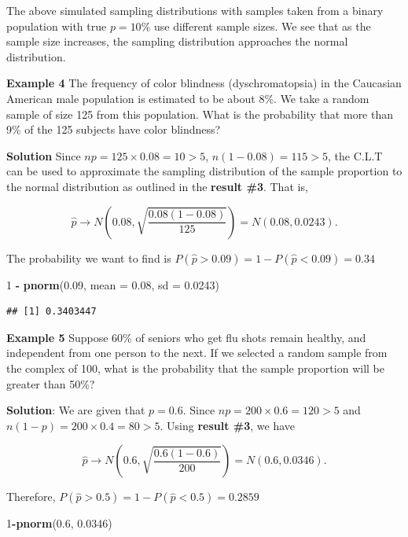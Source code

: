 \documentclass[
]{book}
\newenvironment{Shaded}{\begin{snugshade}}{\end{snugshade}}
\newcommand{\AttributeTok}[1]{\textcolor[rgb]{0.13,0.29,0.53}{#1}}
\newcommand{\DecValTok}[1]{\textcolor[rgb]{0.00,0.00,0.81}{#1}}
\newcommand{\FloatTok}[1]{\textcolor[rgb]{0.00,0.00,0.81}{#1}}
\newcommand{\FunctionTok}[1]{\textcolor[rgb]{0.13,0.29,0.53}{\textbf{#1}}}
\newcommand{\NormalTok}[1]{#1}
\newcommand{\SpecialCharTok}[1]{\textcolor[rgb]{0.81,0.36,0.00}{\textbf{#1}}}
\begin{document}
The above simulated sampling distributions with samples taken from a binary population with true \(p = 10\%\) use different sample sizes. We see that as the sample size increases, the sampling distribution approaches the normal distribution.

\textbf{Example 4} The frequency of color blindness (dyschromatopsia) in the Caucasian American male population is estimated to be about 8\%. We take a random sample of size 125 from this population. What is the probability that more than 9\% of the 125 subjects have color blindness?

\textbf{Solution} Since \(np = 125\times 0.08 = 10 > 5\), \(n(1-0.08) = 115> 5\), the C.L.T can be used to approximate the sampling distribution of the sample proportion to the normal distribution as outlined in the \textbf{result \#3}. That is,

\[
\hat{p} \to N\left(0.08, \sqrt{\frac{0.08(1-0.08)}{125}} \right) =N\left(0.08, 0.0243 \right).
\]

The probability we want to find is \(P(\hat{p} > 0.09) = 1 -P(\hat{p} < 0.09) = 0.34\)

\begin{Shaded}
\begin{Highlighting}[]
\DecValTok{1} \SpecialCharTok{{-}} \FunctionTok{pnorm}\NormalTok{(}\FloatTok{0.09}\NormalTok{, }\AttributeTok{mean =} \FloatTok{0.08}\NormalTok{, }\AttributeTok{sd =} \FloatTok{0.0243}\NormalTok{)}
\end{Highlighting}
\end{Shaded}

\begin{verbatim}
## [1] 0.3403447
\end{verbatim}

\textbf{Example 5} Suppose 60\% of seniors who get flu shots remain healthy, and independent from one person to the next. If we selected a random sample from the complex of 100, what is the probability that the sample proportion will be greater than 50\%?

\textbf{Solution}: We are given that \(p=0.6\). Since \(np=200\times 0.6 = 120 > 5\) and \(n(1-p) = 200 \times 0.4 = 80 > 5\). Using \textbf{result \#3}, we have

\[
\hat{p} \to N\left(0.6, \sqrt{\frac{0.6(1-0.6)}{200}} \right) = N(0.6, 0.0346).
\]

Therefore, \(P(\hat{p} > 0.5) = 1 - P(\hat{p} < 0.5) = 0.2859\)

\begin{Shaded}
\begin{Highlighting}[]
\DecValTok{1}\SpecialCharTok{{-}}\FunctionTok{pnorm}\NormalTok{(}\FloatTok{0.6}\NormalTok{, }\FloatTok{0.0346}\NormalTok{)}
\end{Highlighting}
\end{Shaded}
\end{document}
